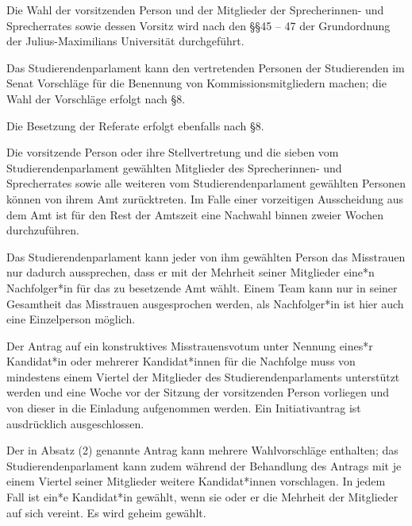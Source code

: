 \documentclass[10pt,a4paper]{scrartcl}
\begin{document}
\begin{contract}


\label{allgemeines}

Die Wahl der vorsitzenden Person und der Mitglieder der Sprecherinnen- und
Sprecherrates sowie dessen Vorsitz wird nach den §§45 -- 47 der Grundordnung der
Julius-Maximilians Universität durchgeführt.

Das Studierendenparlament kann den vertretenden Personen der Studierenden im
Senat Vorschläge für die Benennung von Kommissionsmitgliedern machen; die Wahl
der Vorschläge erfolgt nach §8.

Die Besetzung der Referate erfolgt ebenfalls nach §8.


\label{ruxfccktritt-von-neuwahl}

Die vorsitzende Person oder ihre Stellvertretung und die sieben vom
Studierendenparlament gewählten Mitglieder des Sprecherinnen- und
Sprecherrates sowie alle weiteren vom Studierendenparlament gewählten
Personen können von ihrem Amt zurücktreten. Im Falle einer vorzeitigen
Ausscheidung aus dem Amt ist für den Rest der Amtszeit eine Nachwahl
binnen zweier Wochen durchzuführen.


\label{konstruktives-misstrauensvotum}

  Das Studierendenparlament kann jeder von ihm gewählten Person das
  Misstrauen nur dadurch aussprechen, dass er mit der Mehrheit seiner
  Mitglieder eine*n Nachfolger*in für das zu besetzende Amt wählt. Einem
  Team kann nur in seiner Gesamtheit das Misstrauen ausgesprochen
  werden, als Nachfolger*in ist hier auch eine Einzelperson möglich.
  
	Der Antrag auf ein konstruktives Misstrauensvotum unter Nennung
  eines*r Kandidat*in oder mehrerer Kandidat*innen für die Nachfolge
  muss von mindestens einem Viertel der Mitglieder des Studierendenparlaments
	unterstützt werden und eine Woche vor der Sitzung der
  vorsitzenden Person vorliegen und von dieser in die Einladung
  aufgenommen werden. Ein Initiativantrag ist ausdrücklich
  ausgeschlossen.
     
	Der in Absatz (2) genannte Antrag kann mehrere Wahlvorschläge enthalten;
  das Studierendenparlament kann zudem während der Behandlung des Antrags
  mit je einem Viertel seiner Mitglieder weitere Kandidat*innen
  vorschlagen. In jedem Fall ist ein*e Kandidat*in gewählt, wenn sie
  oder er die Mehrheit der Mitglieder auf sich vereint. Es wird geheim
  gewählt.
     

\end{contract}
\end{document}
